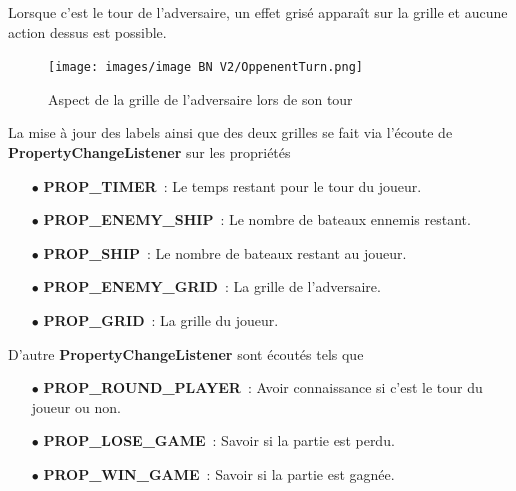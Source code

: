 \documentclass[12pt]{article}
\begin{document}
\bigskip
Lorsque c'est le tour de l'adversaire, un effet grisé apparaît sur la grille et
aucune action dessus est possible.
\begin{figure}[H]
      \centering
      \texttt{[image: images/image BN
            V2/OppenentTurn.png]}
      \caption{Aspect de la grille de l'adversaire lors de son tour}
\end{figure}

\bigskip

La mise à jour des labels ainsi que des deux grilles se fait via l'écoute de
\textbf{PropertyChangeListener} sur les propriétés
\begin{itemize}
      \item[$\bullet$] \textbf{PROP\_TIMER} : Le temps restant pour le tour du
            joueur.
      \item[$\bullet$] \textbf{PROP\_ENEMY\_SHIP} : Le nombre de bateaux
            ennemis restant.
      \item[$\bullet$] \textbf{PROP\_SHIP} : Le nombre de bateaux restant au
            joueur.
      \item[$\bullet$] \textbf{PROP\_ENEMY\_GRID} : La grille de l'adversaire.
      \item[$\bullet$] \textbf{PROP\_GRID} : La grille du joueur.
\end{itemize}
\bigskip
D'autre \textbf{PropertyChangeListener} sont écoutés tels que
\begin{itemize}
      \item[$\bullet$] \textbf{PROP\_ROUND\_PLAYER} : Avoir connaissance si
            c'est le
            tour du joueur ou non.
      \item[$\bullet$] \textbf{PROP\_LOSE\_GAME} : Savoir si la partie est
            perdu.
      \item[$\bullet$] \textbf{PROP\_WIN\_GAME} : Savoir si la partie est
            gagnée.
\end{itemize}

\bigskip
\end{document}

